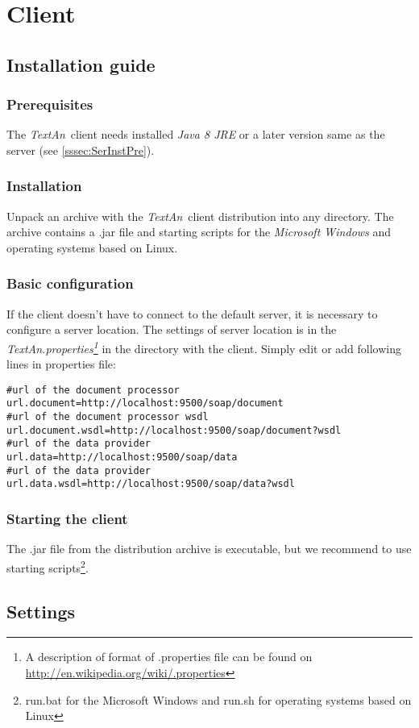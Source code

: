 \documentclass[12pt,a4paper]{report}
\newcommand{\textan}{\emph{TextAn}}
\begin{document}
\section{Client}

\subsection{Installation guide}

\subsubsection{Prerequisites}

The \textan\ client needs installed \emph{Java 8 JRE} or a later version same as the server (see \ref{sssec:SerInstPre}).

\subsubsection{Installation}

Unpack an archive with the \textan\ client distribution into any directory. The archive contains a .jar file and starting scripts for the \emph{Microsoft Windows} and operating systems based on Linux.

\subsubsection{Basic configuration}

If the client doesn't have to connect to the default server, it is necessary to configure a server location. The settings of server location is in the \emph{TextAn.properties\footnote{A description of format of .properties file can be found on \url{http://en.wikipedia.org/wiki/.properties}}} in the directory with the client. Simply edit or add following lines in properties file:
\begin{lstlisting}[frame=single,language=properties]
#url of the document processor
url.document=http://localhost:9500/soap/document
#url of the document processor wsdl
url.document.wsdl=http://localhost:9500/soap/document?wsdl
#url of the data provider
url.data=http://localhost:9500/soap/data
#url of the data provider
url.data.wsdl=http://localhost:9500/soap/data?wsdl
\end{lstlisting}

\subsubsection{Starting the client}

The .jar file from the distribution archive is executable, but we recommend to use starting scripts\footnote{run.bat for the Microsoft Windows and run.sh for operating systems based on Linux}.

\subsection{Settings}
\end{document}
